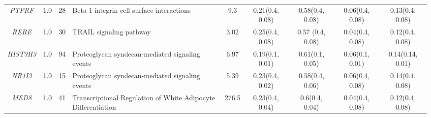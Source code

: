\documentclass[10pt]{article}
\begin{document}
\begin{landscape}
\begin{table}[!htbp]
{\begin{tabular}{c c c l c | c c c c}
\textit{PTPRF} & 1.0 & 28 & Beta 1 integrin cell surface interactions & 9.3 & 0.21(0.4, 0.08) & 0.58(0.4, 0.08) & 0.06(0.4, 0.08) & 0.13(0.4, 0.08) \\[2pt]
\textit{RERE} & 1.0 & 30 & TRAIL signaling pathway & 3.02 & 0.25(0.4, 0.08) & 0.57 (0.4, 0.08) & 0.04(0.4, 0.08) & 0.12(0.4, 0.08) \\[2pt]
\textit{HIST3H3} & 1.0 & 94 & Proteoglycan syndecan-mediated signaling events & 6.97 & 0.19(0.1, 0.01) & 0.61(0.1, 0.05) & 0.06(0.1, 0.01) & 0.14(0.14, 0.01) \\[2pt]
\textit{NR1I3} & 1.0 & 15 & Proteoglycan syndecan-mediated signaling events & 5.39 & 0.23(0.4, 0.02) & 0.58(0.4, 0.06) & 0.06(0.4, 0.08) & 0.14(0.4, 0.08) \\[2pt]
\textit{MED8} & 1.0 & 41 & Transcriptional Regulation of White Adipocyte Differentiation & 276.5 & 0.23(0.4, 0.04) & 0.6(0.4, 0.04) & 0.04(0.4, 0.08) & 0.12(0.4, 0.08) \\[1.5pt] \hline\hline
\end{tabular}}
\label{tab:netnull}
\end{table}
\end{landscape}
\end{document}
